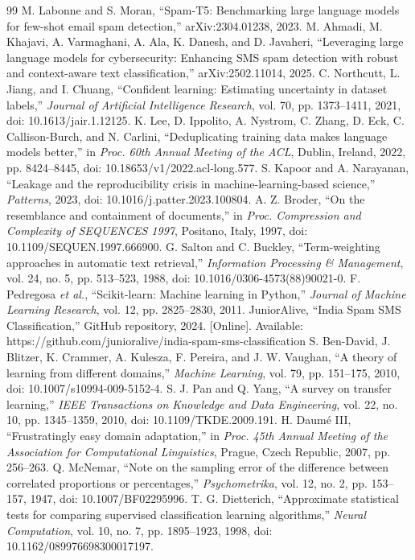 \begin{thebibliography}{99}
 M. Labonne and S. Moran, ``Spam-T5: Benchmarking large language models for few-shot email spam detection,'' arXiv:2304.01238, 2023.
 M. Ahmadi, M. Khajavi, A. Varmaghani, A. Ala, K. Danesh, and D. Javaheri, ``Leveraging large language models for cybersecurity: Enhancing SMS spam detection with robust and context-aware text classification,'' arXiv:2502.11014, 2025.
 C. Northcutt, L. Jiang, and I. Chuang, ``Confident learning: Estimating uncertainty in dataset labels,'' \textit{Journal of Artificial Intelligence Research}, vol. 70, pp. 1373--1411, 2021, doi: 10.1613/jair.1.12125.
 K. Lee, D. Ippolito, A. Nystrom, C. Zhang, D. Eck, C. Callison-Burch, and N. Carlini, ``Deduplicating training data makes language models better,'' in \textit{Proc. 60th Annual Meeting of the ACL}, Dublin, Ireland, 2022, pp. 8424--8445, doi: 10.18653/v1/2022.acl-long.577.
 S. Kapoor and A. Narayanan, ``Leakage and the reproducibility crisis in machine-learning-based science,'' \textit{Patterns}, 2023, doi: 10.1016/j.patter.2023.100804.
 A. Z. Broder, ``On the resemblance and containment of documents,'' in \textit{Proc. Compression and Complexity of SEQUENCES 1997}, Positano, Italy, 1997, doi: 10.1109/SEQUEN.1997.666900.
 G. Salton and C. Buckley, ``Term-weighting approaches in automatic text retrieval,'' \textit{Information Processing \& Management}, vol. 24, no. 5, pp. 513--523, 1988, doi: 10.1016/0306-4573(88)90021-0.
 F. Pedregosa \textit{et al.}, ``Scikit-learn: Machine learning in Python,'' \textit{Journal of Machine Learning Research}, vol. 12, pp. 2825--2830, 2011.
 JuniorAlive, ``India Spam SMS Classification,'' GitHub repository, 2024. [Online]. Available: https://github.com/junioralive/india-spam-sms-classification
 S. Ben-David, J. Blitzer, K. Crammer, A. Kulesza, F. Pereira, and J. W. Vaughan, ``A theory of learning from different domains,'' \textit{Machine Learning}, vol. 79, pp. 151--175, 2010, doi: 10.1007/s10994-009-5152-4.
 S. J. Pan and Q. Yang, ``A survey on transfer learning,'' \textit{IEEE Transactions on Knowledge and Data Engineering}, vol. 22, no. 10, pp. 1345--1359, 2010, doi: 10.1109/TKDE.2009.191.
 H. Daum\'e III, ``Frustratingly easy domain adaptation,'' in \textit{Proc. 45th Annual Meeting of the Association for Computational Linguistics}, Prague, Czech Republic, 2007, pp. 256--263.
 Q. McNemar, ``Note on the sampling error of the difference between correlated proportions or percentages,'' \textit{Psychometrika}, vol. 12, no. 2, pp. 153--157, 1947, doi: 10.1007/BF02295996.
 T. G. Dietterich, ``Approximate statistical tests for comparing supervised classification learning algorithms,'' \textit{Neural Computation}, vol. 10, no. 7, pp. 1895--1923, 1998, doi: 10.1162/089976698300017197.
\end{thebibliography}
\clearpage
